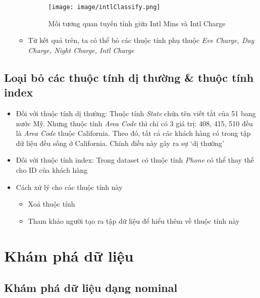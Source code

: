 \documentclass[a4paper, 12pt]{article}
\begin{document}
\begin{itemize}
\begin{itemize}
        \begin{figure}[H]
            \begin{center}
                \texttt{[image: image/intlClassify.png]}
                \caption{Mối tương quan tuyến tính giữa Intl Mins và Intl Charge}
            \end{center}
        \end{figure}

        \item Từ kết quả trên, ta có thể bỏ các thuộc tính phụ thuộc \textit{Eve Charge, Day Charge, Night Charge, Intl Charge}
    \end{itemize}
\end{itemize}

\subsection{Loại bỏ các thuộc tính dị thường \& thuộc tính index}

\begin{itemize}
    \item Đối với thuộc tính dị thường: Thuộc tính \textit{State} chứa tên viết tắt của 51 bang nước Mỹ. Nhưng thuộc tính \textit{Area Code} thì chỉ có 3 giá trị: 408, 415, 510 đều là \textit{Area Code} thuộc California. Theo đó, tất cả các khách hàng có trong tập dữ liệu đều sống ở California. Chính điều này gây ra sự `dị thường'
    \item Đối với thuộc tính index: Trong dataset có thuộc tính \textit{Phone} có thể thay thế cho ID của khách hàng
    \item Cách xử lý cho các thuộc tính này
    \begin{itemize}
        \item Xoá thuộc tính 
        \item Tham khảo người tạo ra tập dữ liệu để hiểu thêm về thuộc tính này
    \end{itemize}
\end{itemize}
\clearpage

\section{Khám phá dữ liệu}

\subsection{Khám phá dữ liệu dạng nominal}
\end{document}
